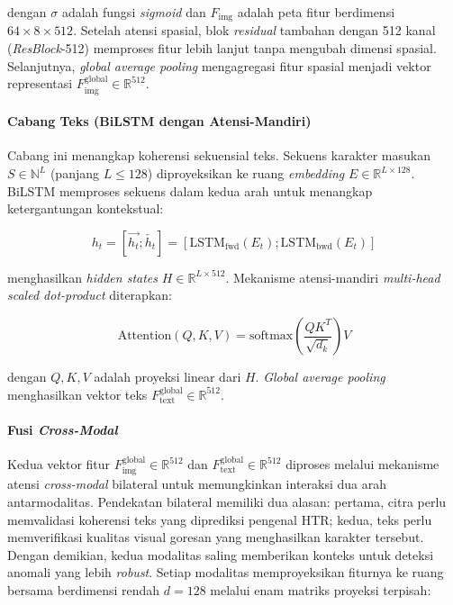 \documentclass[12pt,a4paper]{article}
\begin{document}
\noindent dengan $\sigma$ adalah fungsi \textit{sigmoid} dan $F_{\text{img}}$ adalah peta fitur berdimensi $64 \times 8 \times 512$. Setelah atensi spasial, blok \textit{residual} tambahan dengan 512 kanal (\textit{ResBlock}-512) memproses fitur lebih lanjut tanpa mengubah dimensi spasial. Selanjutnya, \textit{global average pooling} mengagregasi fitur spasial menjadi vektor representasi $F_{\text{img}}^{\text{global}} \in \mathbb{R}^{512}$.

\paragraph{Cabang Teks (BiLSTM dengan Atensi-Mandiri)}

Cabang ini menangkap koherensi sekuensial teks. Sekuens karakter masukan $S \in \mathbb{N}^{L}$ (panjang $L \leq 128$) diproyeksikan ke ruang \textit{embedding} $E \in \mathbb{R}^{L \times 128}$. BiLSTM memproses sekuens dalam kedua arah untuk menangkap ketergantungan kontekstual:

\begin{equation}
  h_t = [\overrightarrow{h_t}; \overleftarrow{h_t}] = [\text{LSTM}_{\text{fwd}}(E_t); \text{LSTM}_{\text{bwd}}(E_t)]
  \label{eq:IV.6}
\end{equation}

\noindent menghasilkan \textit{hidden states} $H \in \mathbb{R}^{L \times 512}$. Mekanisme atensi-mandiri \textit{multi-head scaled dot-product} diterapkan:

\begin{equation}
  \text{Attention}(Q, K, V) = \text{softmax}\left(\frac{QK^T}{\sqrt{d_k}}\right)V
  \label{eq:IV.7}
\end{equation}

\noindent dengan $Q, K, V$ adalah proyeksi linear dari $H$. \textit{Global average pooling} menghasilkan vektor teks $F_{\text{text}}^{\text{global}} \in \mathbb{R}^{512}$.

\paragraph{Fusi \textit{Cross-Modal}}

Kedua vektor fitur $F_{\text{img}}^{\text{global}} \in \mathbb{R}^{512}$ dan $F_{\text{text}}^{\text{global}} \in \mathbb{R}^{512}$ diproses melalui mekanisme atensi \textit{cross-modal} bilateral untuk memungkinkan interaksi dua arah antarmodalitas. Pendekatan bilateral memiliki dua alasan: pertama, citra perlu memvalidasi koherensi teks yang diprediksi pengenal HTR; kedua, teks perlu memverifikasi kualitas visual goresan yang menghasilkan karakter tersebut. Dengan demikian, kedua modalitas saling memberikan konteks untuk deteksi anomali yang lebih \textit{robust}. Setiap modalitas memproyeksikan fiturnya ke ruang bersama berdimensi rendah $d=128$ melalui enam matriks proyeksi terpisah:
\end{document}
